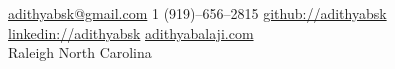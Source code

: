 

\nobreakvspace{0.3em}  %

\noindent
\href{mailto:adithyabsk@gmail.com}{adithyabsk\mbox{}@\mbox{}gmail.com}\sbull{}
\textsmaller{+}1 (919)--656--2815\sbull{}
\href{https://github.com/adithyabsk}{github://adithyabsk}\sbull{}
\href{https://linkedin.com/in/adithyabsk}{linkedin://adithyabsk}\sbull{}
\href{https://www.adithyabalaji.com}{adithyabalaji.com}\\
Raleigh\sbull{}
North Carolina%
